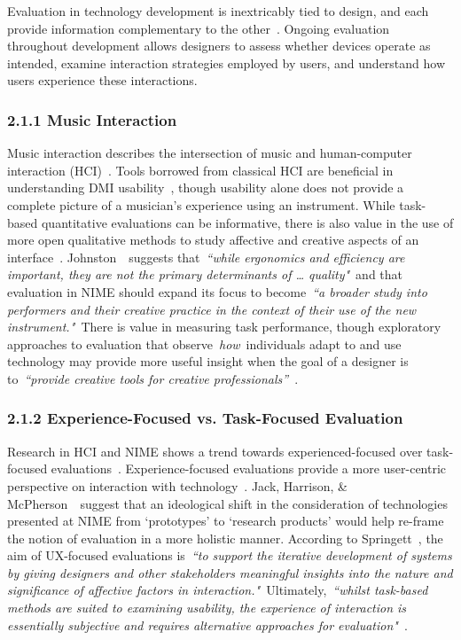 \documentclass[sigconf]{nimeart}
\begin{document}
Evaluation in technology development is inextricably tied to design, and each provide information complementary to the other~\cite{c7}. Ongoing evaluation throughout development allows designers to assess whether devices operate as intended, examine interaction strategies employed by users, and understand how users experience these interactions.

\subsubsection{2.1.1 Music Interaction}\label{music-interaction}

Music interaction describes the intersection of music and human-computer interaction (HCI)~\cite{c8}. Tools borrowed from classical HCI are beneficial in understanding DMI usability~\cite{c9}, though usability alone does not provide a complete picture of a musician's experience using an instrument. While task-based quantitative evaluations can be informative, there is also value in the use of more open qualitative methods to study affective and creative aspects of an interface~\cite{c4}. Johnston~\cite{c10}~suggests that~\emph{``while ergonomics and efficiency are important, they are not the primary determinants of \ldots{} quality"}~and that evaluation in NIME should expand its focus to become~\emph{``a broader study into performers and their creative practice in the context of their use of the new instrument."~}There is value in measuring task performance, though exploratory approaches to evaluation that observe~\emph{how}~individuals adapt to and use technology may provide more useful insight when the goal of a designer is to~\emph{``provide creative tools for creative professionals''}~\cite{c11}.

\subsubsection{2.1.2 Experience-Focused vs. Task-Focused Evaluation}\label{experience-focused-vs.-task-focused-evaluation}

Research in HCI and NIME shows a trend towards experienced-focused over task-focused evaluations~\cite{c3,c12,c13}. Experience-focused evaluations provide a more user-centric perspective on interaction with technology~\cite{c14}. Jack, Harrison, \& McPherson~\cite{c15}~suggest that an ideological shift in the consideration of technologies presented at NIME from `prototypes' to `research products' would help re-frame the notion of evaluation in a more holistic manner. According to Springett~\cite{c16}, the aim of UX-focused evaluations is~\emph{``to support the iterative development of systems by giving designers and other stakeholders meaningful insights into the nature and significance of affective factors in interaction."~}Ultimately,~\emph{``whilst task-based methods are suited to examining usability, the experience of interaction is essentially subjective and requires alternative approaches for evaluation"}~\cite{c4}.~
\end{document}
